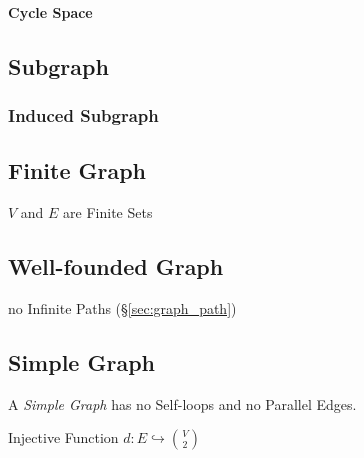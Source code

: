 \paragraph{Cycle Space}\label{sec:cycle_space}\hfill



\subsection{Subgraph}\label{sec:subgraph}

\subsubsection{Induced Subgraph}\label{sec:induced_subgraph}



\subsection{Finite Graph}\label{sec:finite_graph}

$V$ and $E$ are Finite Sets



\subsection{Well-founded Graph}\label{sec:wellfounded_graph}

no Infinite Paths (\S\ref{sec:graph_path})



\subsection{Simple Graph}\label{sec:simple_graph}

A \emph{Simple Graph} has no Self-loops and no Parallel Edges.

Injective Function $d : E \hookrightarrow {V \choose 2}$

